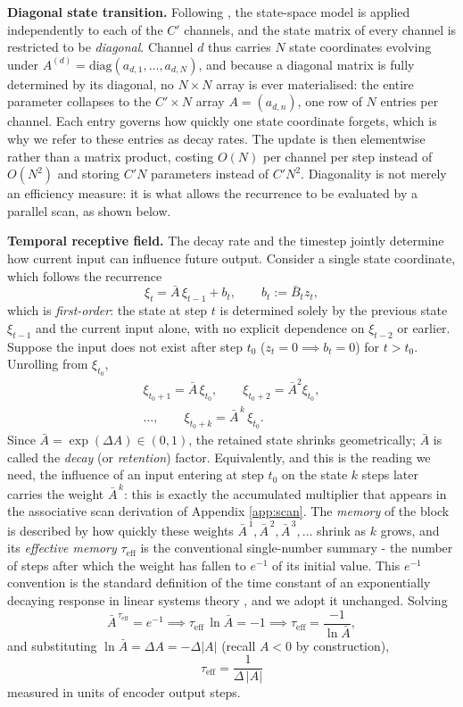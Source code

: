 \documentclass[10pt,a4paper,twocolumn]{article}
\begin{document}
		\textbf{Diagonal state transition.} Following \cite{gu2023mamba}, the state-space model is applied independently to each of the $C'$ channels, and the state matrix of every channel is restricted to be \emph{diagonal}. Channel $d$ thus carries $N$ state coordinates evolving under $A^{(d)} = \mathrm{diag}(a_{d,1},\dots,a_{d,N})$, and because a diagonal matrix is fully determined by its diagonal, no $N \times N$ array is ever materialised: the entire parameter collapses to the $C' \times N$ array $A = (a_{d,n})$, one row of $N$ entries per channel. Each entry governs how quickly one state coordinate forgets, which is why we refer to these entries as decay rates. The update is then elementwise rather than a matrix product, costing $O(N)$ per channel per step instead of $O(N^2)$ and storing $C'N$ parameters instead of $C'N^2$. Diagonality is not merely an efficiency measure: it is what allows the recurrence to be evaluated by a parallel scan, as shown below.

		\textbf{Temporal receptive field.} The decay rate and the timestep jointly determine how current input can influence future output. Consider a single state coordinate, which follows the recurrence $$\xi_t = \bar{A}\,\xi_{t-1} + b_t, \qquad b_t := \bar{B}_t z_t,$$ which is \emph{first-order}: the state at step $t$ is determined solely by the previous state $\xi_{t-1}$ and the current input alone, with no explicit dependence on $\xi_{t-2}$ or earlier. Suppose the input does not exist after step $t_0$ ($z_t = 0 \implies b_t = 0$) for $t > t_0$. Unrolling from $\xi_{t_0}$,
		$$\begin{gathered}\xi_{t_0+1} = \bar{A} \, \xi_{t_0}, \qquad \xi_{t_0+2} = \bar{A}^2 \xi_{t_0}, \\ \dots, \qquad \xi_{t_0+k} = \bar{A}^{\,k}\,\xi_{t_0}.\end{gathered}$$
		Since $\bar{A} = \exp(\Delta A) \in (0,1)$, the retained state shrinks geometrically; $\bar{A}$ is called the \emph{decay} (or \emph{retention}) factor. Equivalently, and this is the reading we need, the influence of an input entering at step $t_0$ on the state $k$ steps later carries the weight $\bar{A}^{\,k}$: this is exactly the accumulated multiplier that appears in the associative scan derivation of Appendix \ref{app:scan}. The \emph{memory} of the block is described by how quickly these weights $\bar{A}^{\,1}, \bar{A}^{\,2}, \bar{A}^{\,3}, \dots$ shrink as $k$ grows, and its \emph{effective memory} $\tau_{\text{eff}}$ is the conventional single-number summary - the number of steps after which the weight has fallen to $e^{-1}$ of its initial value. This $e^{-1}$ convention is the standard definition of the time constant of an exponentially decaying response in linear systems theory \cite{oppenheim1997}, and we adopt it unchanged. Solving $$ \bar{A}^{\,\tau_{\text{eff}}} = e^{-1} \implies \tau_{\text{eff}}\,\ln \bar{A} = -1 \implies \tau_{\text{eff}} = \frac{-1}{\ln \bar{A}},$$ and substituting $\ln\bar{A} = \Delta A = -\Delta|A|$ (recall $A<0$ by construction), $$\boxed{\ \tau_{\text{eff}} = \frac{1}{\Delta\,|A|}\ } $$ measured in units of encoder output steps.
\end{document}
